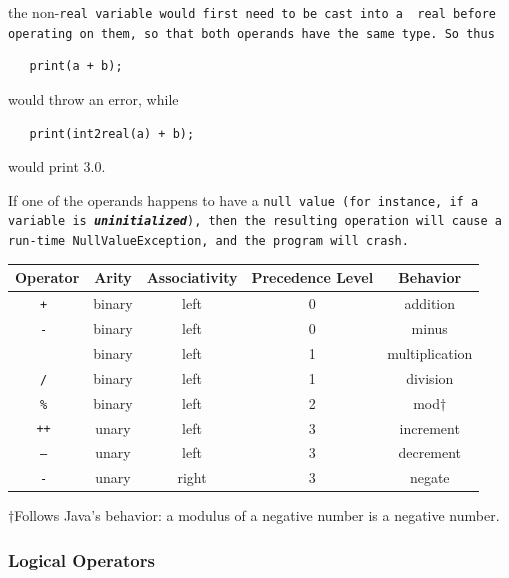 \documentclass{book}
\begin{document}
\noindent the non-\tt real \rm variable would first need to be cast into a \tt
real \rm before operating on them, so that both operands have the
same type. So thus

\begin{verbatim}
   print(a + b);
\end{verbatim}

would throw an error, while

\begin{verbatim}
   print(int2real(a) + b);
\end{verbatim}

would print 3.0.

If one of the operands happens to have a \tt null \rm value (for instance, if a
variable is \textbf{\emph{uninitialized}}), then the resulting operation will
cause a run-time \tt NullValueException\rm, and the program will crash.

\begin{center}
\begin{tabular}{|c|c|c|c|c|}

\hline \textbf{Operator} & \textbf{Arity} & \textbf{Associativity} &
\textbf{Precedence Level} & \textbf{Behavior} \\ \hline
\tt + \rm & binary & left & 0 & addition \\ \hline
\tt - \rm & binary & left & 0 & minus \\ \hline
\tt * \rm & binary & left & 1 & multiplication \\ \hline
\tt / \rm & binary & left & 1 & division \\ \hline
\tt \% \rm & binary & left & 2 & mod$\dagger$
\\ 
\hline
\tt ++ \rm & unary & left & 3 & increment \\ \hline
\tt -- \rm & unary & left & 3 & decrement \\ \hline
\tt - \rm & unary & right & 3 & negate \\ \hline
\end{tabular}
\end{center}

$\dagger$Follows Java's behavior: a modulus of a negative number is a negative
number.

\subsubsection{Logical Operators} %
\label{ssub:logical_operators}
\end{document}
